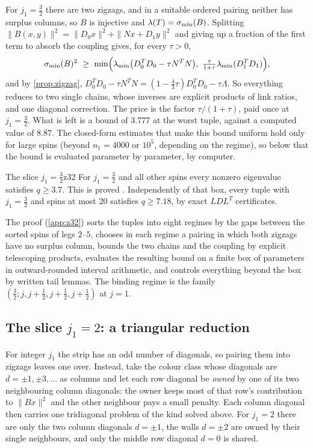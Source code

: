 For $j_1=\frac32$ there are two zigzags, and in a suitable ordered pairing neither has
surplus columns, so $B$ is injective and $\lambda(T)=\sigma_{\min}(B)$. Splitting
$\|B(x,y)\|^2=\|D_0x\|^2+\|Nx+D_1y\|^2$ and giving up a fraction of the first term to
absorb the coupling gives, for every $\tau>0$,
\begin{equation}\label{eq:twochain}
  \smin(B)^2\ \ge\ \min\Bigl(\lambda_{\min}\bigl(D_0^TD_0-\tau N^TN\bigr),\ \tfrac{\tau}{1+\tau}\lambda_{\min}(D_1^TD_1)\Bigr),
\end{equation}
and by \cref{prop:zigzag}, $D_0^TD_0-\tau N^TN=(1-\frac43\tau)D_0^TD_0-\tau\Lambda$. So
everything reduces to two single chains, whose inverses are explicit products of link
ratios, and one diagonal correction. The price is the factor $\tau/(1+\tau)$, paid
once at $j_1=\frac32$. What is left is a bound of $3.777$ at the worst tuple, against a
computed value of $8.87$. The closed-form estimates that make this bound uniform hold only
for large spins (beyond $n_1=4000$ or $10^5$, depending on the regime), so below that
the bound is evaluated parameter by parameter, by computer.

\begin{theorem}{The slice \texorpdfstring{$j_1=\frac32$}{j1 = 3/2}}{z32}
For $j_1=\frac32$ and all other spins every nonzero eigenvalue satisfies $q\ge3.7$.
This is proved \zstatus. Independently of that box, every tuple with $j_1=\frac32$ and
spins at most $20$ satisfies $q\ge7.18$, by exact $LDL^T$ certificates.
\end{theorem}

The proof (\cref{app:z32}) sorts the tuples into eight regimes by the gaps between the
sorted spins of legs $2$--$5$, chooses in each regime a pairing in which both zigzags have
no surplus column, bounds the two chains and the coupling by explicit telescoping
products, evaluates the resulting bound on a finite box of parameters in
outward-rounded interval arithmetic, and controls everything beyond the box by written
tail lemmas. The binding regime is the family $(\frac32;j,j+\frac12,j+\frac12,j+\frac12)$
at $j=1$.

\subsection{The slice \texorpdfstring{$j_1=2$}{j1 = 2}: a triangular reduction}

For integer $j_1$ the strip has an odd number of diagonals, so pairing them into
zigzags leaves one over. Instead, take the colour class whose diagonals are
$d=\pm1,\pm3,\dots$ as columns and let each row diagonal be \emph{owned} by one of its
two neighbouring column diagonals: the owner keeps most of that row's contribution to
$\|Bx\|^2$ and the other neighbour pays a small penalty. Each column diagonal then
carries one tridiagonal problem of the kind solved above. For $j_1=2$ there are only
the two column diagonals $d=\pm1$, the walls $d=\pm2$ are owned by their single
neighbours, and only the middle row diagonal $d=0$ is shared.

